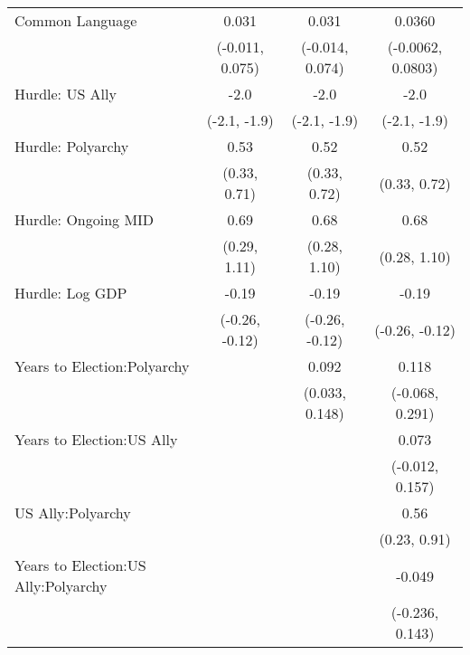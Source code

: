 \begin{longtable}[t]{lccc}
Common Language & 0.031 & 0.031 & 0.0360\\
 & (-0.011, 0.075) & (-0.014, 0.074) & (-0.0062, 0.0803)\\
Hurdle: US Ally & -2.0 & -2.0 & -2.0\\
 & (-2.1, -1.9) & (-2.1, -1.9) & (-2.1, -1.9)\\
Hurdle: Polyarchy & 0.53 & 0.52 & 0.52\\
 & (0.33, 0.71) & (0.33, 0.72) & (0.33, 0.72)\\
Hurdle: Ongoing MID & 0.69 & 0.68 & 0.68\\
 & (0.29, 1.11) & (0.28, 1.10) & (0.28, 1.10)\\
Hurdle: Log GDP & -0.19 & -0.19 & -0.19\\
 & (-0.26, -0.12) & (-0.26, -0.12) & (-0.26, -0.12)\\
Years to Election:Polyarchy &  & 0.092 & 0.118\\
 &  & (0.033, 0.148) & (-0.068, 0.291)\\
Years to Election:US Ally &  &  & 0.073\\
 &  &  & (-0.012, 0.157)\\
US Ally:Polyarchy &  &  & 0.56\\
 &  &  & (0.23, 0.91)\\
Years to Election:US Ally:Polyarchy &  &  & -0.049\\
 &  &  & (-0.236, 0.143)\\
\bottomrule
\end{longtable}
